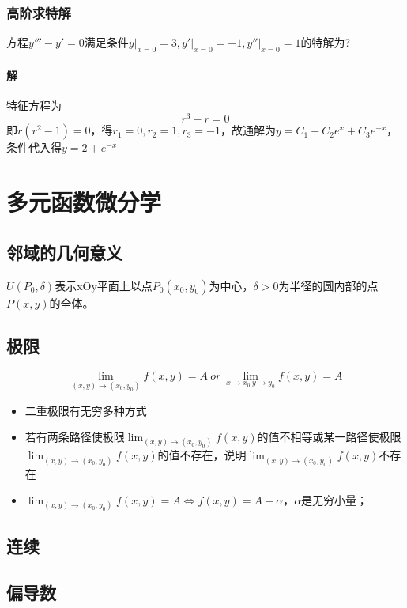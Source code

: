 \subsubsection{高阶求特解}
方程\(y''' - y' = 0\)满足条件\(y\bigg|_{x = 0} = 3, y'\bigg|_{x = 0} = -1, y''\bigg|_{x = 0} = 1\)的特解为?
\paragraph{解}
特征方程为\[r^3 - r = 0\]即\(r(r^2 - 1) = 0\)，得\(r_1 = 0, r_2 = 1, r_3 = -1\)，故通解为\(y = C_1 + C_2e^x + C_3e^{-x}\)，条件代入得\(y = 2 + e^{-x}\)


\section{多元函数微分学}

\subsection{邻域的几何意义}
\(U(P_0, \delta)\)表示xOy平面上以点\(P_0(x_0, y_0)\)为中心，\(\delta > 0\)为半径的圆内部的点\(P(x, y)\)的全体。

\subsection{极限}
\[\lim_{(x, y) \to (x_0, y_0)}f(x, y) = A\ or\ \lim_{x\to x_0\ y \to y_0}f(x, y) = A\]

\begin{itemize}
    \item 二重极限有无穷多种方式
    \item 若有两条路径使极限\(\displaystyle\lim_{(x, y) \to (x_0, y_0)}f(x, y)\)的值不相等或某一路径使极限\(\displaystyle\lim_{(x, y) \to (x_0, y_0)}f(x, y)\)的值不存在，说明\(\displaystyle\lim_{(x, y) \to (x_0, y_0)}f(x, y)\)不存在
    \item \(\displaystyle\lim_{(x, y) \to (x_0, y_0)}f(x, y) = A \Leftrightarrow f(x, y) = A + \alpha\)，\(\alpha\)是无穷小量；
\end{itemize}


\subsection{连续}


\subsection{偏导数}


